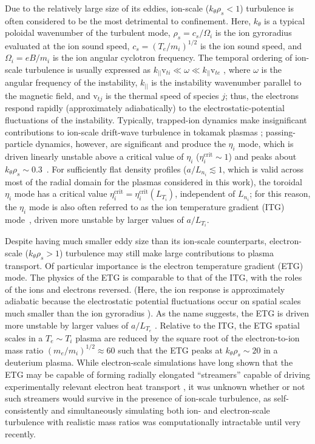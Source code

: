 Due to the relatively large size of its eddies,
ion-scale ($k_{\theta} \rho_s < 1$) turbulence is often considered
to be the most detrimental to confinement.
Here, $k_{\theta}$ is a typical poloidal wavenumber of the turbulent mode,
$\rho_s = c_s / \Omega_i$ is the ion gyroradius
evaluated at the ion sound speed,
$c_s = (T_e / m_i)^{1/2}$ is the ion sound speed, and
$\Omega_i = e B / m_i$ is the ion angular cyclotron frequency.
The temporal ordering of ion-scale turbulence is usually expressed as
$k_{||} \text{v}_{ti} \ll \omega \ll k_{||} \text{v}_{te}$
\cite[Sec.~8.3]{wesson},
where $\omega$ is the angular frequency of the instability,
$k_{||}$ is the instability wavenumber parallel to the magnetic field, and
$\text{v}_{tj}$ is the thermal speed of species $j$;
thus, the electrons respond rapidly (approximately adiabatically)
to the electrostatic-potential fluctuations
of the instability.
Typically, trapped-ion dynamics make insignificant contributions
to ion-scale drift-wave turbulence in tokamak plasmas
\cite[Sec.~IV.E]{horton_drift_waves};
passing-particle dynamics, however, are significant and
produce the $\eta_i$ mode, which
is driven linearly unstable
above a critical value of $\eta_i$ ($\eta_i^{\text{crit}} \sim 1$)
\cite[Sec.~8.3]{wesson} and
peaks about $k_{\theta} \rho_s \sim 0.3$~\cite[Sec.~1.2.1]{tynan_ppcf09}.
For sufficiently flat density profiles
($a / L_{n_i} \lesssim 1$,
which is valid across most of the radial domain
for the plasmas considered in this work),
the toroidal $\eta_i$ mode has a critical value
$\eta_{i}^{\text{crit}} = \eta_{i}^{\text{crit}}(L_{T_i})$,
independent of $L_{n_i}$;
for this reason, the $\eta_i$ mode is
also often referred to as
the ion temperature gradient (ITG) mode~\cite[Sec.8.3]{wesson},
driven more unstable by larger values of $a / L_{T_i}$.

Despite having much smaller eddy size
than its ion-scale counterparts,
electron-scale ($k_{\theta} \rho_s > 1$) turbulence
may still make large contributions to plasma transport.
Of particular importance
is the electron temperature gradient (ETG) mode.
The physics of the ETG is comparable to that of the ITG,
with the roles of the ions and electrons reversed.
(Here, the ion response is approximately adiabatic
because the electrostatic potential fluctuations
occur on spatial scales much smaller than the ion gyroradius
\cite[Sec.~2.3.4.2]{fusion_physics_iaea}).
As the name suggests,
the ETG is driven more unstable by larger values of $a / L_{T_e}$
\cite[Sec.~8.3]{wesson}.
Relative to the ITG,
the ETG spatial scales in a $T_e \sim T_i$ plasma
are reduced by the square root
of the electron-to-ion mass ratio
$(m_e / m_i)^{1/2} \approx 60$ such that
the ETG peaks at $k_{\theta} \rho_s \sim 20$
in a deuterium plasma.
While electron-scale simulations have long shown that the ETG
may be capable of forming radially elongated ``streamers''
\cite{dorland_prl00}
capable of driving experimentally relevant electron heat transport
\cite{jenko_prl02},
it was unknown whether or not
such streamers would survive
in the presence of ion-scale turbulence,
as self-consistently and simultaneously simulating
both ion- and electron-scale turbulence with realistic mass ratios
was computationally intractable until very recently.


